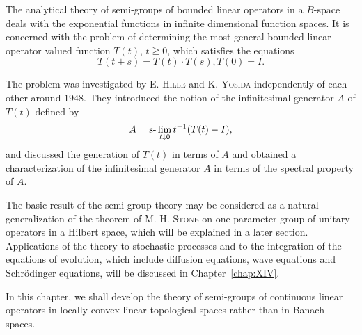 \label{chap:IX}

The analytical theory of semi-groups of bounded linear operators in a $B$-space deals with the exponential functions in infinite dimensional function spaces. It is concerned with the problem of determining the most general bounded linear operator valued function $T(t)$, $t \geqq 0$, which satisfies the equations 
\[
T (t + s) = T (t) \cdot T (s), T (0) = I.
\]

The problem was investigated by E. \textsc{Hille} \cite{hille98} and K. \textsc{Yosida} \cite{yosida348} independently of each other around $1948$. They introduced the notion of the infinitesimal generator $A$ of $T(t)$ defined by 
\[
A = \text{s-}\lim _{t \downarrow 0} t ^{-1} (T (t) - I),
\]
and discussed the generation of $T(t)$ in terms of $A$ and obtained a characterization of the infinitesimal generator $A$ in terms of the spectral property of $A$. 

The basic result of the semi-group theory may be considered as a natural generalization of the theorem of M. H. \textsc{Stone} \cite{stone312} on one-parameter group of unitary operators in a Hilbert space, which will be explained in a later section. Applications of the theory to stochastic processes and to the integration of the equations of evolution, which include diffusion equations, wave equations and Schrödinger equations, will be discussed in Chapter~\ref{chap:XIV}. 

In this chapter, we shall develop the theory of semi-groups of continuous linear operators in locally convex linear topological spaces rather than in Banach spaces. 


\label{sec:IX.1}

